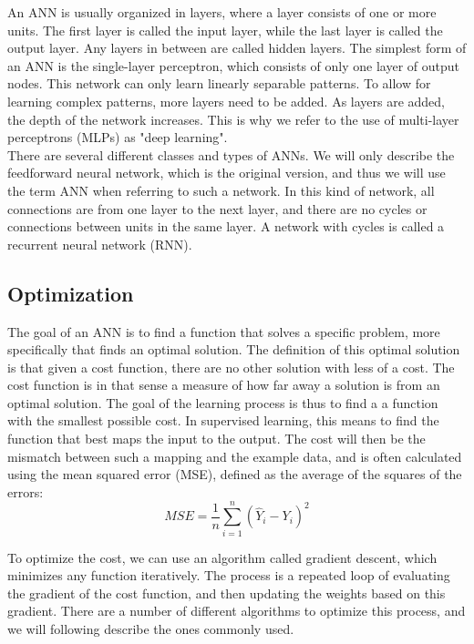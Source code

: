\noindent An ANN is usually organized in layers, where a layer consists of one or more units. The first layer is called the input layer, while the last layer is called the output layer. Any layers in between are called hidden layers. The simplest form of an ANN is the single-layer perceptron, which consists of only one layer of output nodes. This network can only learn linearly separable patterns. To allow for learning complex patterns, more layers need to be added. As layers are added, the depth of the network increases. This is why we refer to the use of multi-layer perceptrons (MLPs) as "deep learning". \\

\noindent There are several different classes and types of ANNs. We will only describe the feedforward neural network, which is the original version, and thus we will use the term ANN when referring to such a network. In this kind of network, all connections are from one layer to the next layer, and there are no cycles or connections between units in the same layer. A network with cycles is called a recurrent neural network (RNN).

\subsection{Optimization}

The goal of an ANN is to find a function that solves a specific problem, more specifically that finds an optimal solution. The definition of this optimal solution is that given a cost function, there are no other solution with less of a cost. The cost function is in that sense a measure of how far away a solution is from an optimal solution. The goal of the learning process is thus to find a a function with the smallest possible cost. In supervised learning, this means to find the function that best maps the input to the output. The cost will then be the mismatch between such a mapping and the example data, and is often calculated using the mean squared error (MSE), defined as the average of the squares of the errors:
\begin{equation}
    MSE = \frac{1}{n}\sum_{i=1}^{n}(\hat{Y}_i - Y_i)^2
\end{equation}

\noindent To optimize the cost, we can use an algorithm called gradient descent, which minimizes any function iteratively. The process is a repeated loop of evaluating the gradient of the cost function, and then updating the weights based on this gradient. There are a number of different algorithms to optimize this process, and we will following describe the ones commonly used.

